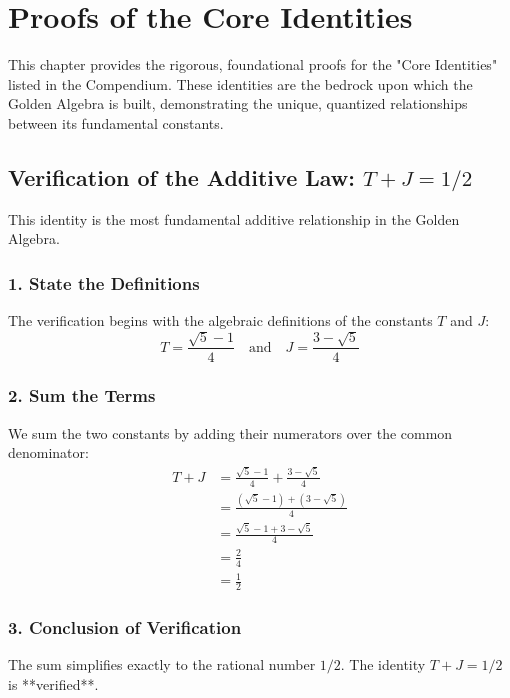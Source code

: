 
\section{Proofs of the Core Identities}
\label{sec:core_identities}

This chapter provides the rigorous, foundational proofs for the "Core Identities" listed in the Compendium. These identities are the bedrock upon which the Golden Algebra is built, demonstrating the unique, quantized relationships between its fundamental constants.
\newpage
\subsection{Verification of the Additive Law: \texorpdfstring{\(T + J = 1/2\)}{T + J = 1/2}}
This identity is the most fundamental additive relationship in the Golden Algebra.

\subsubsection*{1. State the Definitions}
The verification begins with the algebraic definitions of the constants $T$ and $J$:
$$ T = \frac{\sqrt{5}-1}{4} \quad \text{and} \quad J = \frac{3-\sqrt{5}}{4} $$

\subsubsection*{2. Sum the Terms}
We sum the two constants by adding their numerators over the common denominator:
\begin{align*}
T + J &= \frac{\sqrt{5}-1}{4} + \frac{3-\sqrt{5}}{4} \\
&= \frac{(\sqrt{5}-1) + (3-\sqrt{5})}{4} \\
&= \frac{\sqrt{5} - 1 + 3 - \sqrt{5}}{4} \\
&= \frac{2}{4} \\
&= \frac{1}{2}
\end{align*}

\subsubsection*{3. Conclusion of Verification}
The sum simplifies exactly to the rational number $1/2$. The identity $T+J = 1/2$ is **verified**.
\newpage
